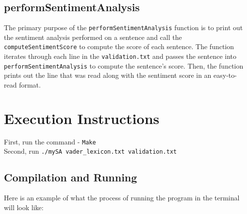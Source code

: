 \documentclass[a4paper]{article}
\begin{document}
\subsection{performSentimentAnalysis}

The primary purpose of the \texttt{performSentimentAnalysis} function is to print out the sentiment analysis performed on a sentence and call the \texttt{computeSentimentScore} to compute the score of each sentence. The function iterates through each line in the \texttt{validation.txt} and passes the sentence into \texttt{performSentimentAnalysis} to compute the sentence's score. Then, the function prints out the line that was read along with the sentiment score in an easy-to-read format.

\section{Execution Instructions}

First, run the command - \texttt{Make}\\
Second, run \texttt{./mySA vader\_lexicon.txt validation.txt}

\subsection{Compilation and Running}
Here is an example of what the process of running the program in the terminal will look like:
\end{document}
